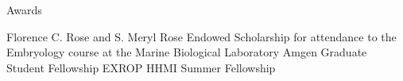 \begin{rubric}{Awards}

\entry*[2018]
  Florence C. Rose and S. Meryl Rose Endowed Scholarship for attendance to the
  Embryology course at the Marine Biological Laboratory
\entry*[2014]
  Amgen Graduate Student Fellowship
\entry*[2011]
  EXROP HHMI Summer Fellowship

\end{rubric}
